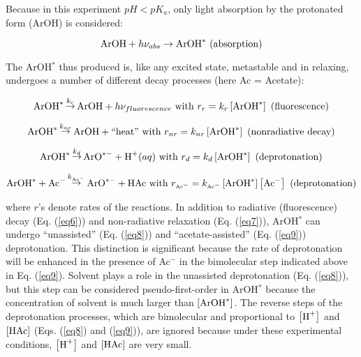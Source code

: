 \documentclass[byrevtex,amssymb,aps,pra,floatfix,letterpaper]{revtex4}
\begin{document}
Because in this experiment $pH < pK_a$, only light absorption by the protonated form (ArOH) is considered:

\begin{equation}
\textnormal{ArOH} + h\nu_{abs} \rightarrow \textnormal{ArOH}^*\textnormal{ (absorption)}
\label{eq5}
\end{equation}

The ArOH$^*$ thus produced is, like any excited state, metastable and in relaxing, undergoes a number of different decay processes (here Ac = Acetate):

\begin{equation}
\textnormal{ArOH}^* \mathop\rightarrow\limits^{k_r} \textnormal{ArOH} + h\nu_{fluorescence} \textnormal{ with }r_r = k_r\left[\textnormal{ArOH}^*\right]\textnormal{ (fluorescence)}
\label{eq6}
\end{equation}

\begin{equation}
\textnormal{ArOH}^* \mathop\rightarrow\limits^{k_{nr}} \textnormal{ArOH} + \textnormal{``heat''} \textnormal{ with }r_{nr} = k_{nr}\left[\textnormal{ArOH}^*\right]\textnormal{ (nonradiative decay)}
\label{eq7}
\end{equation}

\begin{equation}
\textnormal{ArOH}^* \mathop\rightarrow\limits^{k_d} \textnormal{ArO}^{*-} + \textnormal{H}^+(aq) \textnormal{ with }r_d = k_d\left[\textnormal{ArOH}^*\right]\textnormal{ (deprotonation)}
\label{eq8}
\end{equation}

\begin{equation}
\textnormal{ArOH}^* + \textnormal{Ac}^- \mathop\rightarrow\limits^{k_{\textnormal{\tiny Ac}^-}} \textnormal{ArO}^{*-} + \textnormal{HAc} \textnormal{ with }r_{\textnormal{\tiny Ac}^-} = k_{\textnormal{\tiny Ac}^-}\left[\textnormal{ArOH}^*\right]\left[\textnormal{Ac}^-\right]\textnormal{ (deprotonation)}
\label{eq9}
\end{equation}

\noindent
where $r$'s denote rates of the reactions. In addition to radiative (fluorescence) decay (Eq. (\ref{eq6})) and non-radiative relaxation (Eq. (\ref{eq7})), ArOH$^*$ can undergo ``unassisted'' (Eq. (\ref{eq8})) and ``acetate-assisted'' (Eq. (\ref{eq9})) deprotonation. This distinction is significant because the rate
of deprotonation will be enhanced in the presence of Ac$^-$ in the bimolecular step indicated above in Eq. (\ref{eq9}). Solvent plays a role in the unassisted deprotonation (Eq. (\ref{eq8})), but this step can be considered pseudo-first-order in ArOH$^*$ because the concentration of solvent is much larger than $\left[\textnormal{ArOH}^*\right]$. The reverse steps of the deprotonation processes, which are bimolecular and proportional to $\left[\textnormal{H}^+\right]$ and $\left[\textnormal{HAc}\right]$ (Eqs. (\ref{eq8}) and (\ref{eq9})), are ignored because under these experimental conditions, $\left[\textnormal{H}^+\right]$ and $\left[\textnormal{HAc}\right]$ are very small.
\end{document}

